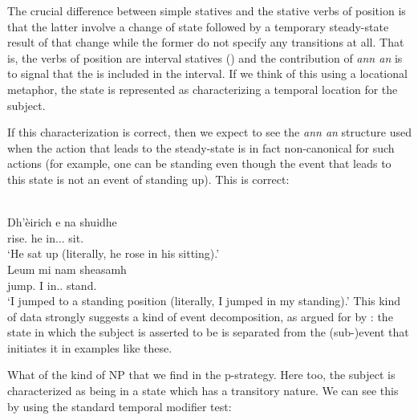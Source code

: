 \documentclass[output=paper]{langsci/langscibook}
\begin{document}
\ea {}
\z\z
The crucial difference between simple statives and the stative verbs of
position is that the latter involve a change of state followed by a temporary
steady-state result of that change while the former do not specify any
transitions at all. That is, the verbs of position are interval statives
(\citealt[184]{Dowty:1979}) and the contribution of \emph{ann an} is to signal
that the  is included in the interval. If we think of this using a
locational metaphor, the state is represented as characterizing a temporal
location for the subject.

If this characterization is correct, then we expect to see the \emph{ann an}
structure used when the action that leads to the steady-state is in fact
non-canonical for such actions (for example, one can be standing even though
the event that leads to this state is not an event of standing up). This is
correct:

\ea {}\\
 \gll Dh'\`eirich e na shuidhe\\
rise.\Pst{} he in.\Poss.\Tsg.\M{} sit.\Vn{}\\
\glt \enquote*{He sat up (literally, he rose in his sitting).}
\ex {}\\
\gll  Leum mi nam sheasamh\\
jump.\Pst{} I in.\Poss.\Fsg{} stand.\Vn{}\\
\glt \enquote*{I jumped to a standing position (literally, I jumped in my standing).}\label{leum}
\z
This kind of data strongly suggests a kind of event decomposition, as argued
for by \citet{ramchand08}: the state in which the subject is asserted to be is
separated from the (sub-)event that initiates it in examples like these.

What of the kind of NP  that we find in the p-strategy. Here too,
the subject is characterized as being in a state which has a transitory nature.
We can see this by using the standard temporal modifier test:
\end{document}

